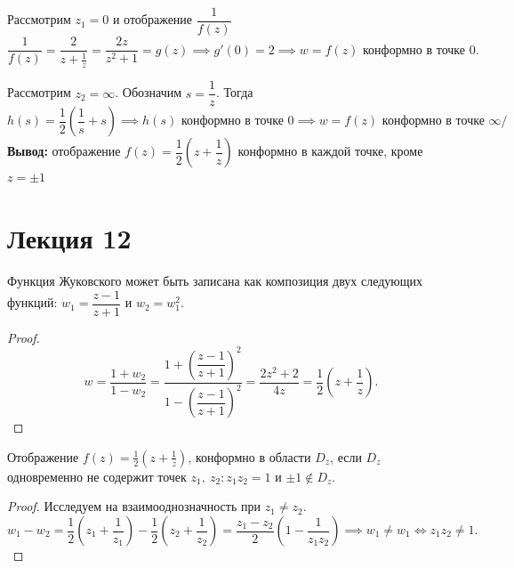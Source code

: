 	Рассмотрим $z_1 = 0$ и отображение $\dfrac{1}{f(z)}$
	\[ \frac{1}{f(z)} = \frac{2}{z + \frac{1}{z}} = \frac{2z}{z^2 + 1} = g(z) \implies g'(0) = 2 \implies w = f(z) \text{ конформно в точке } 0.\]
	
	Рассмотрим $z_2 = \infty$. Обозначим $s = \dfrac{1}{z}$. Тогда
	\[ h(s) = \frac{1}{2}(\frac{1}{s} + s) \implies h(s)\text{ конформно в точке } 0 \implies w = f(z) \text{ конформно в точке } \infty/ \]
	\textbf{Вывод:} отображение $ f(z) = \dfrac{1}{2} (z + \dfrac{1}{z}) $ конформно в каждой точке, кроме $ z = \pm 1 $
	\newpage
	\section{Лекция 12}
	\begin{statement}
		Функция Жуковского может быть записана как композиция двух следующих функций: 
		$w_1 = \dfrac{z - 1}{z + 1}$ и $w_2 = w_1^2$.
	\end{statement}
	\begin{proof}
		\[ w = \frac{1 + w_2}{1 - w_2} = \frac{1 + \left( \dfrac{z - 1}{z + 1}\right) ^2}{1 - \left( \dfrac{z - 1}{z + 1}\right) ^2} = \frac{2z^2 + 2}{4z} = \frac{1}{2}\left( z + \frac{1}{z}\right). \]
	\end{proof}
	\vspace{-\baselineskip}
	\begin{statement}
		Отображение $ f(z) = \frac{1}{2} (z + \frac{1}{z})$, конформно в области $ D_z $, если
		$ D_z $ одновременно не содержит точек $ z_1,\ z_2 : z_1z_2 = 1$ и $\pm 1 \notin D_z$.
	\end{statement}
	\begin{proof}
		Исследуем на взаимооднозначность при $z_1\ne z_2$.
		\[w_1 - w_2 = \frac{1}{2}\left(z_1 + \frac{1}{z_1}\right)-\frac{1}{2}\left(z_2+\frac{1}{z_2}\right) = \frac{z_1-z_2}{2}\left(1-\frac{1}{z_1z_2}\right)\implies w_1\ne w_1\iff z_1z_2\ne 1. \]
	\end{proof}
	\vspace{-\baselineskip}

